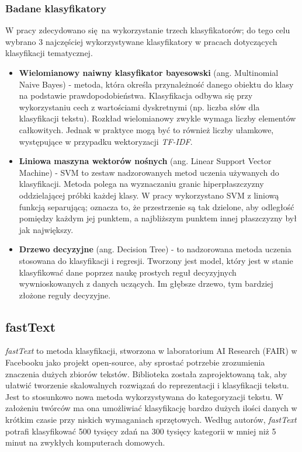 \subsubsection{Badane klasyfikatory}
W pracy zdecydowano się na wykorzystanie trzech klasyfikatorów; do tego celu wybrano 3 najczęściej wykorzystywane klasyfikatory w pracach dotyczących klasyfikacji tematycznej. \cite{walkowiak2018} \cite{text-classification-stanford}\cite{maciej-baj}
\begin{itemize}
 \setlength\itemsep{2em}
\item \textbf{Wielomianowy naiwny klasyfikator bayesowski} (ang. Multinomial Naive Bayes) - metoda, która określa przynależność danego obiektu do klasy na podstawie prawdopodobieństwa. \cite{internet-stat-book} Klasyfikacja odbywa się przy wykorzystaniu cech z wartościami dyskretnymi (np. liczba słów dla klasyfikacji tekstu). Rozkład wielomianowy zwykle wymaga liczby elementów całkowitych. Jednak w praktyce mogą być to również liczby ułamkowe, występujące w przypadku wektoryzacji \textit{TF-IDF}. \cite{skl-reference}

\item \textbf{Liniowa maszyna wektorów nośnych} (ang. Linear Support Vector Machine) - SVM to zestaw nadzorowanych metod uczenia używanych do klasyfikacji. Metoda polega na wyznaczaniu granic hiperpłaszczyzny oddzielającej próbki każdej klasy. W pracy wykorzystano SVM z liniową funkcją separującą; oznacza to, że przestrzenie są tak dzielone, aby odległość pomiędzy każdym jej punktem, a najbliższym punktem innej płaszczyzny był jak największy. \cite{internet-stat-book}

\item \textbf{Drzewo decyzyjne} (ang. Decision Tree) - to nadzorowana metoda uczenia stosowana do klasyfikacji i regresji. Tworzony jest model, który jest w stanie klasyfikować dane poprzez naukę prostych reguł decyzyjnych wywnioskowanych z danych uczących. Im głębsze drzewo, tym bardziej złożone reguły decyzyjne. \cite{skl-reference}
\end{itemize}

\subsection{fastText}
\textit{fastText} to metoda klasyfikacji, stworzona w laboratorium AI Research (FAIR) w Facebooku jako projekt open-source, aby sprostać potrzebie zrozumienia znaczenia dużych zbiorów tekstów. Biblioteka została zaprojektowaną tak, aby ułatwić tworzenie skalowalnych rozwiązań do reprezentacji i klasyfikacji tekstu. Jest to stosunkowo nowa metoda wykorzystywana do kategoryzacji tekstu. W założeniu twórców ma ona umożliwiać klasyfikację bardzo dużych ilości danych w krótkim czasie przy niskich wymaganiach sprzętowych. Według autorów, \textit{fastText} potrafi klasyfikować 500 tysięcy zdań na 300 tysięcy kategorii w mniej niż 5 minut na zwykłych komputerach domowych. \cite{faster-better-fasttext}

